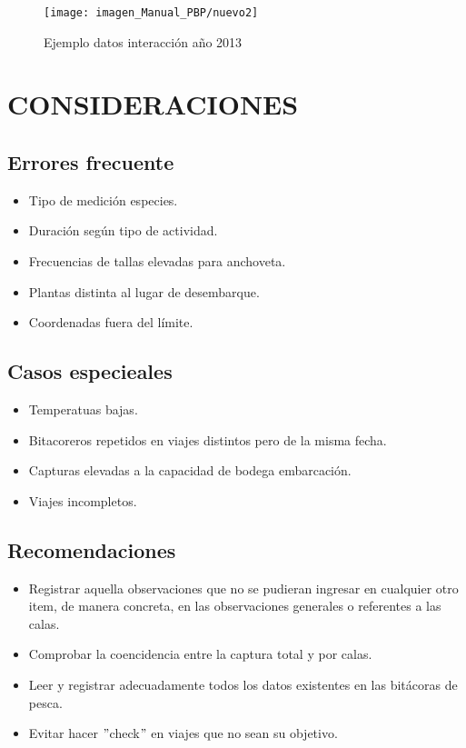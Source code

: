 \documentclass[a4paper,oneside,11pt]{book}
\begin{document}
 \begin{figure}
 \centering
 \texttt{[image: imagen\_Manual\_PBP/nuevo2]}
 \caption{Ejemplo datos interacción año 2013}
 \label{fig:inter}
 \end{figure}
 
\chapter{CONSIDERACIONES}
\section{Errores frecuente}
\begin{itemize}
\item{} Tipo de medición especies.
\item{} Duración según tipo de actividad.
\item{} Frecuencias de tallas elevadas para anchoveta.
\item{} Plantas distinta al lugar de desembarque.
\item{} Coordenadas fuera del límite.
\end{itemize}

\section{Casos especieales}
\begin{itemize}
\item{} Temperatuas bajas.
\item{} Bitacoreros repetidos en viajes distintos pero de la misma fecha.
\item{} Capturas elevadas a la capacidad de bodega embarcación.
\item{} Viajes incompletos.
\end{itemize}

\section{Recomendaciones}
\begin{itemize}
\item{} Registrar aquella observaciones que no se pudieran ingresar en cualquier otro item, de manera concreta, en las observaciones generales o referentes a las calas.
\item{} Comprobar la coencidencia entre la captura total y por calas.
\item{} Leer y registrar adecuadamente todos los datos existentes en las bitácoras de pesca.
\item{} Evitar hacer $"$check$"$ en viajes que no sean su objetivo.
\end{itemize}
\end{document}
